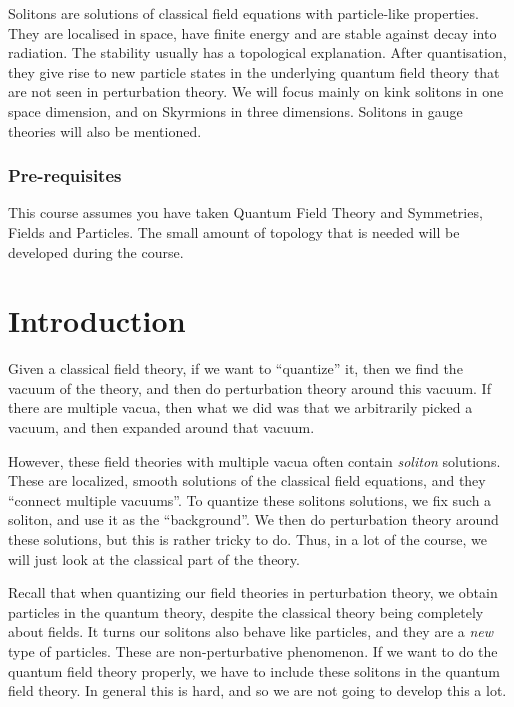 \documentclass[a4paper]{article}
\begin{document}
\maketitle
{\small
\setlength{\parindent}{0em}
\setlength{\parskip}{1em}
Solitons are solutions of classical field equations with particle-like properties. They are localised in space, have finite energy and are stable against decay into radiation. The stability usually has a topological explanation. After quantisation, they give rise to new particle states in the underlying quantum field theory that are not seen in perturbation theory. We will focus mainly on kink solitons in one space dimension, and on Skyrmions in three dimensions. Solitons in gauge theories will also be mentioned.

\subsubsection*{Pre-requisites}
This course assumes you have taken Quantum Field Theory and Symmetries, Fields and Particles. The small amount of topology that is needed will be developed during the course.
}
\tableofcontents

\setcounter{section}{-1}
\section{Introduction}
Given a classical field theory, if we want to ``quantize'' it, then we find the vacuum of the theory, and then do perturbation theory around this vacuum. If there are multiple vacua, then what we did was that we arbitrarily picked a vacuum, and then expanded around that vacuum.

However, these field theories with multiple vacua often contain \emph{soliton} solutions. These are localized, smooth solutions of the classical field equations, and they ``connect multiple vacuums''. To quantize these solitons solutions, we fix such a soliton, and use it as the ``background''. We then do perturbation theory around these solutions, but this is rather tricky to do. Thus, in a lot of the course, we will just look at the classical part of the theory.

Recall that when quantizing our field theories in perturbation theory, we obtain particles in the quantum theory, despite the classical theory being completely about fields. It turns our solitons also behave like particles, and they are a \emph{new} type of particles. These are non-perturbative phenomenon. If we want to do the quantum field theory properly, we have to include these solitons in the quantum field theory. In general this is hard, and so we are not going to develop this a lot.
\end{document}
